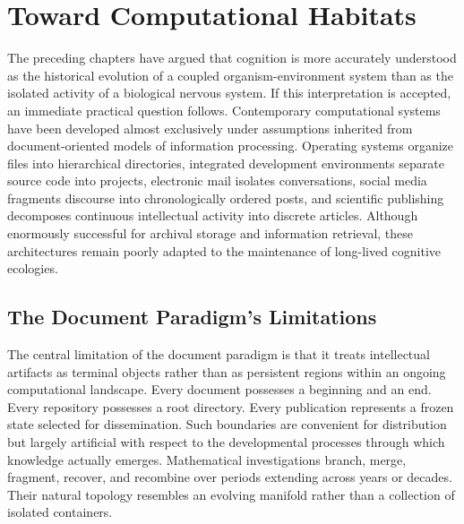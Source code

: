 \documentclass[12pt,oneside]{article}
\theoremstyle{remark}
\begin{document}

\section{Toward Computational Habitats}

The preceding chapters have argued that cognition is more accurately understood as the historical evolution of a coupled organism-environment system than as the isolated activity of a biological nervous system. If this interpretation is accepted, an immediate practical question follows. Contemporary computational systems have been developed almost exclusively under assumptions inherited from document-oriented models of information processing. Operating systems organize files into hierarchical directories, integrated development environments separate source code into projects, electronic mail isolates conversations, social media fragments discourse into chronologically ordered posts, and scientific publishing decomposes continuous intellectual activity into discrete articles. Although enormously successful for archival storage and information retrieval, these architectures remain poorly adapted to the maintenance of long-lived cognitive ecologies.

\subsection{The Document Paradigm's Limitations}

The central limitation of the document paradigm is that it treats intellectual artifacts as terminal objects rather than as persistent regions within an ongoing computational landscape. Every document possesses a beginning and an end. Every repository possesses a root directory. Every publication represents a frozen state selected for dissemination. Such boundaries are convenient for distribution but largely artificial with respect to the developmental processes through which knowledge actually emerges. Mathematical investigations branch, merge, fragment, recover, and recombine over periods extending across years or decades. Their natural topology resembles an evolving manifold rather than a collection of isolated containers.
\end{document}
